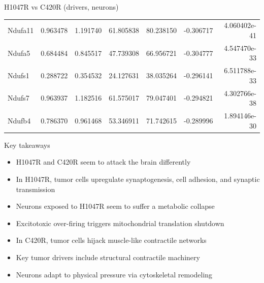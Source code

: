 \documentclass[10pt, aspectratio=169]{beamer}
\begin{document}
\begin{frame}{H1047R vs C420R (drivers, neurons)}
\begin{tabular}{l r r r r r r}
    Ndufa11 & 0.963478 & 1.191740 & 61.805838 & 80.238150 & -0.306717 & 4.060402e-41 \\
    Ndufa5 & 0.684484 & 0.845517 & 47.739308 & 66.956721 & -0.304777 & 4.547470e-33 \\
    Ndufs1 & 0.288722 & 0.354532 & 24.127631 & 38.035264 & -0.296141 & 6.511788e-33 \\
    Ndufs7 & 0.963937 & 1.182516 & 61.575017 & 79.047401 & -0.294821 & 4.302766e-38 \\
    Ndufb4 & 0.786370 & 0.961468 & 53.346911 & 71.742615 & -0.289996 & 1.894146e-30 \\
    \bottomrule
  \end{tabular}
\end{frame}

\begin{frame}{Key takeaways}
  \begin{itemize}
    \item H1047R and C420R seem to attack the brain differently
    \item In H1047R, tumor cells upregulate synaptogenesis, cell adhesion, and synaptic transmission
    \item Neurons exposed to H1047R seem to suffer a metabolic collapse
    \item Excitotoxic over-firing triggers mitochondrial translation shutdown
    \item In C420R, tumor cells hijack muscle-like contractile networks
    \item Key tumor drivers include structural contractile machinery
    \item Neurons adapt to physical pressure via cytoskeletal remodeling
  \end{itemize}
\end{frame}
\end{document}
